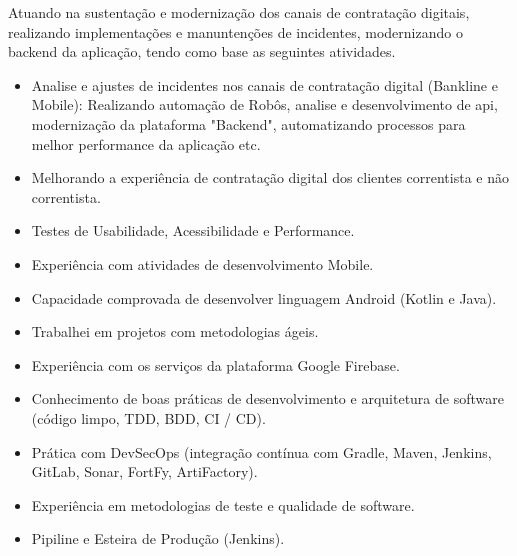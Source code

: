 \documentclass[10pt,a4paper]{altacv}
\begin{document}
\divider
{} 
\divider
 Atuando na sustentação e modernização dos canais de contratação digitais, realizando implementações e manuntenções de incidentes, modernizando o backend da aplicação, tendo como base as seguintes atividades.
\divider
\begin{itemize}
\item Analise e ajustes de incidentes nos canais de contratação digital (Bankline e Mobile): Realizando automação de Robôs, analise e desenvolvimento de api, modernização da plataforma "Backend", automatizando processos para melhor performance da aplicação etc.
\item Melhorando a experiência de contratação digital dos clientes correntista e não correntista.
\item Testes de Usabilidade, Acessibilidade e Performance.


\divider
{} 
\item Experiência com atividades de desenvolvimento Mobile.
\item Capacidade comprovada de desenvolver linguagem Android (Kotlin e Java).
\item Trabalhei em projetos com metodologias ágeis.
\item Experiência com os serviços da plataforma Google Firebase.
\item Conhecimento de boas práticas de desenvolvimento e arquitetura de software (código limpo, TDD, BDD, CI / CD).
\item Prática com DevSecOps (integração contínua com Gradle, Maven, Jenkins, GitLab, Sonar, FortFy, ArtiFactory).
\item Experiência em metodologias de teste e qualidade de software.
\item Pipiline e Esteira de Produção (Jenkins).
\divider
\end{itemize}
\medskip
\clearpage
\end{document}
